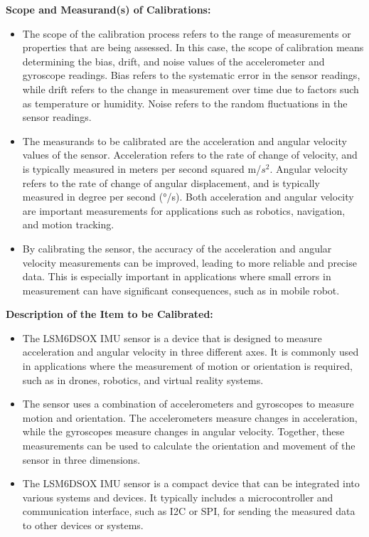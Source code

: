 \textbf{Scope and Measurand(s) of Calibrations:}
\begin{itemize}
    \item The scope of the calibration process refers to the range of measurements or properties that are being assessed. In this case, the scope of calibration means determining the bias, drift, and noise values of the accelerometer and gyroscope readings. Bias refers to the systematic error in the sensor readings, while drift refers to the change in measurement over time due to factors such as temperature or humidity. Noise refers to the random fluctuations in the sensor readings.
    \item The measurands to be calibrated are the acceleration and angular velocity values of the sensor. Acceleration refers to the rate of change of velocity, and is typically measured in meters per second squared m/\(s^2\). Angular velocity refers to the rate of change of angular displacement, and is typically measured in degree per second (°/s). Both acceleration and angular velocity are important measurements for applications such as robotics, navigation, and motion tracking.
    \item By calibrating the sensor, the accuracy of the acceleration and angular velocity measurements can be improved, leading to more reliable and precise data. This is especially important in applications where small errors in measurement can have significant consequences, such as in mobile robot.
\end{itemize}

\textbf{Description of the Item to be Calibrated:}

\begin{itemize}
\item The LSM6DSOX IMU sensor is a device that is designed to measure acceleration and angular velocity in three different axes. It is commonly used in applications where the measurement of motion or orientation is required, such as in drones, robotics, and virtual reality systems.
\item The sensor uses a combination of accelerometers and gyroscopes to measure motion and orientation. The accelerometers measure changes in acceleration, while the gyroscopes measure changes in angular velocity. Together, these measurements can be used to calculate the orientation and movement of the sensor in three dimensions.
\item The LSM6DSOX IMU sensor is a compact device that can be integrated into various systems and devices. It typically includes a microcontroller and communication interface, such as I2C or SPI, for sending the measured data to other devices or systems.
\end{itemize}

